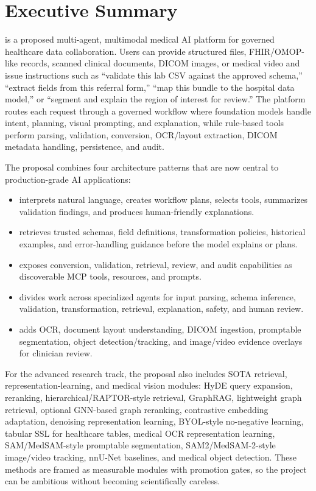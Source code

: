 \section{Executive Summary}

\projectname{} is a proposed multi-agent, multimodal medical AI platform for governed healthcare data collaboration. Users can provide structured files, FHIR/OMOP-like records, scanned clinical documents, DICOM images, or medical video and issue instructions such as ``validate this lab CSV against the approved schema,'' ``extract fields from this referral form,'' ``map this bundle to the hospital data model,'' or ``segment and explain the region of interest for review.'' The platform routes each request through a governed workflow where foundation models handle intent, planning, visual prompting, and explanation, while rule-based tools perform parsing, validation, conversion, OCR/layout extraction, DICOM metadata handling, persistence, and audit.

The proposal combines four architecture patterns that are now central to production-grade AI applications:

\begin{itemize}
  \item {} interprets natural language, creates workflow plans, selects tools, summarizes validation findings, and produces human-friendly explanations.
  \item {} retrieves trusted schemas, field definitions, transformation policies, historical examples, and error-handling guidance before the model explains or plans.
  \item {} exposes conversion, validation, retrieval, review, and audit capabilities as discoverable MCP tools, resources, and prompts.
  \item {} divides work across specialized agents for input parsing, schema inference, validation, transformation, retrieval, explanation, safety, and human review.
  \item {} adds OCR, document layout understanding, DICOM ingestion, promptable segmentation, object detection/tracking, and image/video evidence overlays for clinician review.
\end{itemize}

For the advanced research track, the proposal also includes SOTA retrieval, representation-learning, and medical vision modules: HyDE query expansion, reranking, hierarchical/RAPTOR-style retrieval, GraphRAG, lightweight graph retrieval, optional GNN-based graph reranking, contrastive embedding adaptation, denoising representation learning, BYOL-style no-negative learning, tabular SSL for healthcare tables, medical OCR representation learning, SAM/MedSAM-style promptable segmentation, SAM2/MedSAM-2-style image/video tracking, nnU-Net baselines, and medical object detection. These methods are framed as measurable modules with promotion gates, so the project can be ambitious without becoming scientifically careless.

